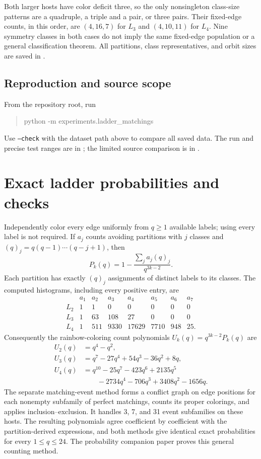 \documentclass[11pt,letterpaper]{article}
\begin{document}
Both larger hosts have color deficit three, so the only nonsingleton
class-size patterns are a quadruple, a triple and a pair, or three pairs.
Their fixed-edge counts, in this order, are $(4,16,7)$ for $L_3$ and
$(4,10,11)$ for $L_4$. Nine symmetry classes in both cases do not imply
the same fixed-edge population or a general classification theorem.
All partitions, class representatives, and orbit sizes are saved in
.

\subsection*{Reproduction and source scope}
From the repository root, run
\begin{quote}\small\ttfamily
python -m experiments.ladder\_matchings
\end{quote}
Use \texttt{--check} with the dataset path above to compare all saved data.
The run and precise test ranges are in ;
the limited source comparison is in .

\newpage
\section{Exact ladder probabilities and checks}
Independently color every edge uniformly from $q\ge1$ available labels; using
every label is not required. If $a_j$ counts avoiding partitions with $j$
classes and $(q)_j=q(q-1)\cdots(q-j+1)$, then
\[
 P_k(q)=1-\frac{\sum_j a_j(q)_j}{q^{3k-2}} .
\]
Each partition has exactly $(q)_j$ assignments of distinct labels to its
classes. The computed histograms, including every positive entry, are
\[
\begin{array}{c|rrrrrrr}
 & a_1&a_2&a_3&a_4&a_5&a_6&a_7\\ \hline
L_2&1&1&0&0&0&0&0\\
L_3&1&63&108&27&0&0&0\\
L_4&1&511&9330&17629&7710&948&25 .
\end{array}
\]
Consequently the rainbow-coloring count polynomials $U_k(q)=q^{3k-2}P_k(q)$
are
\begin{align*}
U_2(q)&=q^4-q^2,\\
U_3(q)&=q^7-27q^4+54q^3-36q^2+8q,\\
U_4(q)&=q^{10}-25q^7-423q^6+2135q^5\\
 &\qquad{}-2734q^4-706q^3+3408q^2-1656q .
\end{align*}
The separate matching-event method forms a conflict graph on edge positions
for each nonempty subfamily of perfect matchings, counts its proper colorings,
and applies inclusion--exclusion. It handles 3, 7, and 31 event subfamilies
on these hosts. The resulting polynomials agree coefficient by coefficient
with the partition-derived expressions, and both methods give identical
exact probabilities for every $1\le q\le24$. The probability companion paper
proves this general counting method.
\end{document}
